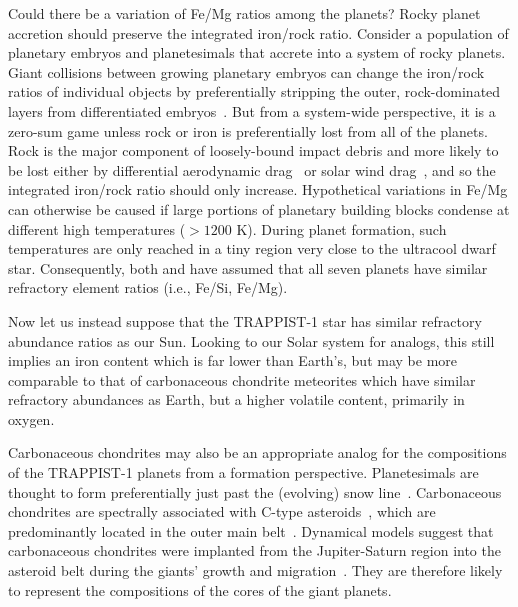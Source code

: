 \documentclass[twocolumn]{aastex63}
\begin{document}
Could there be a variation of Fe/Mg ratios among the planets?
Rocky planet accretion should preserve the integrated iron/rock ratio. Consider a population of planetary embryos and planetesimals that accrete into a system of rocky planets. Giant collisions between growing planetary embryos can change the iron/rock ratios of individual objects by preferentially stripping the outer, rock-dominated layers from differentiated embryos~\citep[e.g.][]{benz88,marcus10,asphaug14}. But from a system-wide perspective, it is a zero-sum game unless rock or iron is preferentially lost from all of the planets. Rock is the major component of loosely-bound impact debris and more likely to be lost either by differential aerodynamic drag~\citep{weidenschilling77} or solar wind drag~\citep{spalding20}, and so the integrated iron/rock ratio should only increase.
Hypothetical variations in Fe/Mg can otherwise be caused if large portions of planetary building blocks condense at different high temperatures (${>} 1200$ K). During planet formation, such temperatures are only reached in a tiny region very close to the ultracool dwarf star. Consequently, both \citet{Unterborn2018a} and \citet{Dorn2018} have assumed that all seven planets have similar refractory element ratios (i.e., Fe/Si, Fe/Mg).

Now let us instead suppose that the TRAPPIST-1 star has similar refractory abundance ratios as our Sun.  Looking to our Solar system for analogs, this still implies an iron content which is far lower than Earth's, but may be more comparable to that of carbonaceous chondrite meteorites which have similar refractory abundances as Earth, but a higher volatile content, primarily in oxygen.

Carbonaceous chondrites may also be an appropriate analog for the compositions of the TRAPPIST-1 planets from a formation perspective. Planetesimals are thought to form preferentially just past the (evolving) snow line~\citep{armitage16,drazkowska17,schoonenberg17}.  Carbonaceous chondrites are spectrally associated with C-type asteroids~\citep{bus02,burbine02}, which are predominantly located in the outer main belt~\citep{gradie82,demeo13}.  Dynamical models suggest that carbonaceous chondrites were implanted from the Jupiter-Saturn region into the asteroid belt during the giants' growth and migration~\citep{walsh11,raymond17,ronnet18,raymond20}.  They are therefore likely to represent the compositions of the cores of the giant planets.
\end{document}
